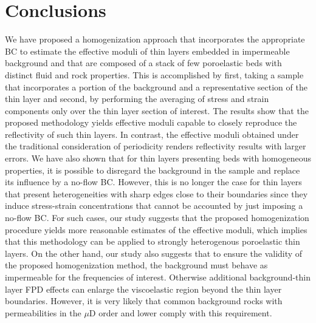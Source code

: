 \documentclass[draft]{agujournal2019}
\begin{document}


\section{Conclusions}
We have proposed a homogenization approach that incorporates the appropriate BC to estimate the effective moduli of thin layers embedded in impermeable background and that are composed of a stack of few poroelastic beds with distinct fluid and rock properties. This is accomplished by first, taking a sample that incorporates a portion of the background and a representative section of the thin layer and second, by performing the averaging of stress and strain components only over the thin layer section of interest.
The results show that the proposed methodology yields effective moduli capable to closely reproduce the reflectivity of such thin layers. In contrast, the effective moduli obtained under the traditional consideration of periodicity renders reflectivity results with larger errors. We  have also shown that for thin layers presenting beds with homogeneous properties, it is possible to disregard the background in the sample and replace its influence by a no-flow BC. However, this is no longer the case for thin layers that present heterogeneities with sharp edges close to their boundaries since they induce stress-strain concentrations that cannot be accounted by just imposing a no-flow BC. For such cases, our study suggests that the proposed homogenization procedure yields more reasonable estimates of the effective moduli, which implies that this methodology can be applied to strongly heterogenous poroelastic thin layers. On the other hand, our study also suggests that to ensure the validity of the proposed homogenization method, the background must behave as impermeable for the frequencies of interest. Otherwise additional background-thin layer FPD effects can enlarge the viscoelastic region beyond the thin layer boundaries. However, it is very likely that common background rocks with permeabilities in the $\mu$D order and lower comply with this requirement.
\end{document}
